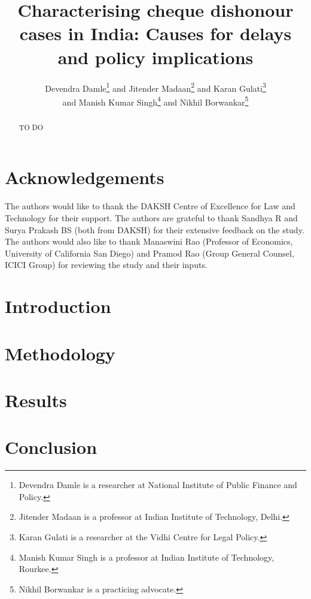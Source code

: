 \documentclass[12pt,a4paper]{article}
\title{Characterising cheque dishonour cases in India: Causes for delays and policy implications}
\author{Devendra Damle\thanks{Devendra Damle is a researcher at National Institute of Public Finance and Policy.} and Jitender Madaan\thanks{Jitender Madaan is a professor at Indian Institute of Technology, Delhi.} and Karan Gulati\thanks{Karan Gulati is a researcher at the Vidhi Centre for Legal Policy.}\\ and Manish Kumar Singh\thanks{Manish Kumar Singh is a professor at Indian Institute of Technology, Rourkee.} and Nikhil Borwankar\thanks{Nikhil Borwankar is a practicing advocate.}}
\begin{document}
\maketitle

\begin{abstract}
TO DO
\end{abstract}

\newpage
\tableofcontents
\newpage
\printglossaries
\listoftables
\newpage

\section*{Acknowledgements}
The authors would like to thank the DAKSH Centre of Excellence for Law and Technology for their support. The authors are grateful to thank Sandhya R and Surya Prakash BS (both from DAKSH) for their extensive feedback on the study. The authors would also like to thank Manaswini Rao (Professor of Economics, University of California San Diego) and Pramod Rao (Group General Counsel, ICICI Group) for reviewing the study and their inputs.

\newpage
\section{Introduction}
\label{sec:introduction}


\section{Methodology}
\label{sec:methodology}


\section{Results}
\label{sec:results}


\section{Conclusion}
\label{sec:conclusion}


\newpage
\printbibliography[heading=bibintoc]
\newpage

\begin{appendices}

\end{appendices}
\end{document}
